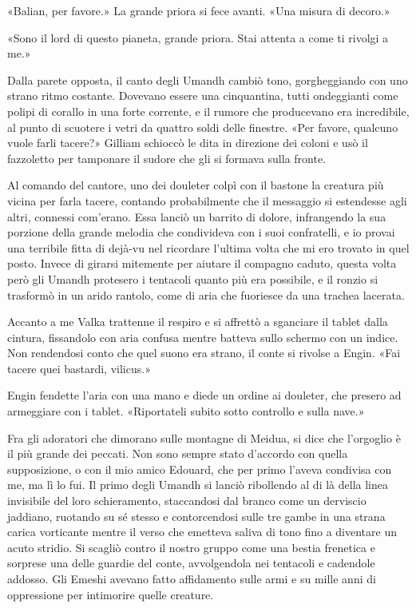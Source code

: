 «Balian, per favore.» La grande priora si fece avanti. «Una misura di
decoro.»

«Sono il lord di questo pianeta, grande priora. Stai attenta a come ti
rivolgi a me.»

Dalla parete opposta, il canto degli Umandh cambiò tono, gorgheggiando
con uno strano ritmo costante. Dovevano essere una cinquantina, tutti
ondeggianti come polipi di corallo in una forte corrente, e il rumore
che producevano era incredibile, al punto di scuotere i vetri da quattro
soldi delle finestre. «Per favore, qualcuno vuole farli tacere?» Gilliam
schioccò le dita in direzione dei coloni e usò il fazzoletto per
tamponare il sudore che gli si formava sulla fronte.

Al comando del cantore, uno dei douleter colpì con il bastone la
creatura più vicina per farla tacere, contando probabilmente che il
messaggio si estendesse agli altri, connessi com'erano. Essa lanciò un
barrito di dolore, infrangendo la sua porzione della grande {melodia}
che condivideva con i suoi confratelli, e io provai una terribile fitta
di dejà-vu nel ricordare l'ultima volta che mi ero trovato in quel
posto. Invece di girarsi mitemente per aiutare il compagno caduto,
questa volta però gli Umandh protesero i tentacoli quanto più era
possibile, e il ronzio si trasformò in un arido rantolo, come di aria
che fuoriesce da una trachea lacerata.

Accanto a me Valka trattenne il respiro e si affrettò a sganciare il
tablet dalla cintura, fissandolo con aria confusa mentre batteva sullo
schermo con un indice. Non rendendosi conto che quel suono era strano,
il conte si rivolse a Engin. «Fai tacere quei bastardi, vilicus.»

Engin fendette l'aria con una mano e diede un ordine ai douleter, che
presero ad armeggiare con i tablet. «Riportateli subito sotto controllo
e sulla nave.»

Fra gli adoratori che dimorano sulle montagne di Meidua, si dice che
l'orgoglio è il più grande dei peccati. Non sono sempre stato d'accordo
con quella supposizione, o con il mio amico Edouard, che per primo
l'aveva condivisa con me, ma lì lo fui. Il primo degli Umandh si lanciò
ribollendo al di là della linea invisibile del loro schieramento,
staccandosi dal branco come un derviscio jaddiano, ruotando su sé stesso
e contorcendosi sulle tre gambe in una strana carica vorticante mentre
il verso che emetteva saliva di tono fino a diventare un acuto stridio.
Si scagliò contro il nostro gruppo come una bestia frenetica e sorprese
una delle guardie del conte, avvolgendola nei tentacoli e cadendole
addosso. Gli Emeshi avevano fatto affidamento sulle armi e su mille anni
di oppressione per intimorire quelle creature.

